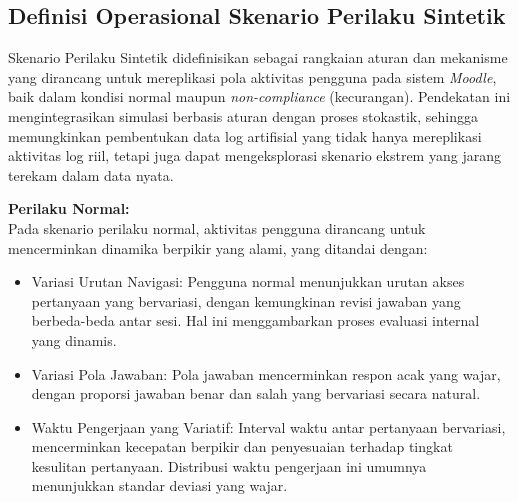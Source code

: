 \subsection{Definisi Operasional Skenario Perilaku Sintetik}
\label{sec:definisiOperasionalSkenarioPerilakuSintetik}
Skenario Perilaku Sintetik didefinisikan sebagai rangkaian aturan dan mekanisme yang dirancang untuk mereplikasi pola aktivitas pengguna pada sistem \textit{Moodle}, baik dalam kondisi normal maupun \textit{non-compliance} (kecurangan). Pendekatan ini mengintegrasikan simulasi berbasis aturan dengan proses stokastik, sehingga memungkinkan pembentukan data log artifisial yang tidak hanya mereplikasi aktivitas log riil, tetapi juga dapat mengeksplorasi skenario ekstrem yang jarang terekam dalam data nyata.

\textbf{Perilaku Normal:} \\
Pada skenario perilaku normal, aktivitas pengguna dirancang untuk mencerminkan dinamika berpikir yang alami, yang ditandai dengan:
\begin{itemize}
    \item Variasi Urutan Navigasi: Pengguna normal menunjukkan urutan akses pertanyaan yang bervariasi, dengan kemungkinan revisi jawaban yang berbeda-beda antar sesi. Hal ini menggambarkan proses evaluasi internal yang dinamis.
    \item Variasi Pola Jawaban: Pola jawaban mencerminkan respon acak yang wajar, dengan proporsi jawaban benar dan salah yang bervariasi secara natural.
    \item Waktu Pengerjaan yang Variatif: Interval waktu antar pertanyaan bervariasi, mencerminkan kecepatan berpikir dan penyesuaian terhadap tingkat kesulitan pertanyaan. Distribusi waktu pengerjaan ini umumnya menunjukkan standar deviasi yang wajar.
\end{itemize}

